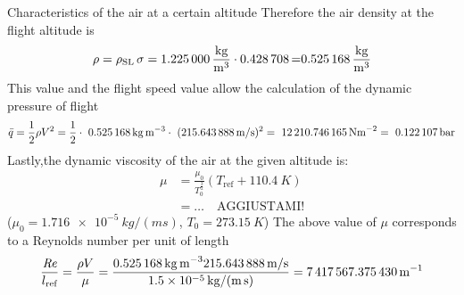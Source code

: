 \documentclass[[12pt,twoside]{book}
\begin{document}
\begin{myExampleX}{Characteristics of the air at a certain altitude}{}
Therefore the air density at the flight altitude is
\[
\rho = \rho_\text{SL} \, \sigma 
    = \SI[round-precision=3]{\myDensitysealevel}{\frac{kg}{m^{3}}} 
        \cdot \SI[round-precision=3]{\myRelativedensity} 
    = \SI[round-precision=3]{\myDensity}{\frac{kg}{m^{3}}}
\]
%
This value and the flight speed value allow the calculation of the dynamic pressure of flight
\[
\bar{q}=\frac{1}{2} \rho V^{2} =\frac{1}{2}\cdot\ \SI[round-precision=3]{\myDensity}{kg~m^{-3}} \cdot\ (\SI[round-precision=2]{\mySpeedMs}{m/s})^{2} =~\SI[round-precision=2]{\myDynamicpressureNm}{N m^{-2}}=~\SI[round-precision=3]{\myDynamicpressureBar}{bar}
\]
Lastly,the dynamic viscosity of the air at the given  altitude is:
\[
\begin{split}
\mu & {}= \frac{\mu_0}{T_0^{\frac{3}{2}}} \left( T_\text{ref} + \SI{110.4}{K}\right)
    \\
    & {}= \ldots \quad\text{AGGIUSTAMI!}
\end{split}
\]
($\mu_0=\SI[scientific-notation=true]{1.716e-5}{kg/(ms)}$, $T_0=\SI{273.15}{K}$)
The above value of $\mu$ corresponds to a Reynolds number per unit of length
\[
 \frac{\text{\itshape{Re}}}{l_\text{ref}} 
   = \frac{\rho V}{\mu}
   = \frac{
     \SI[round-precision=3]{\myDensity}{kg\,m^{-3}}
       \SI[round-precision=2]{\mySpeedMs}{m/s}
       }{
         \SI[round-precision=2,scientific-notation=true]{\myDynamicviscosity}{kg/(m\,s)}
       }
 = \SI[round-precision=0]{\myReynoldsnumeberperunitoflenght}{m^{-1}}
\]

\end{myExampleX}
\end{document}
